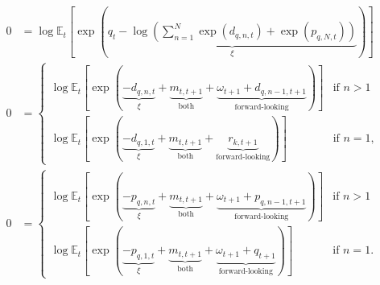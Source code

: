\documentclass[12 pt, oneside]{article}
\theoremstyle{definition}
\theoremstyle{definition}
\theoremstyle{definition}
\newcommand{\E}{\mathbb{E}}
\begin{document}
\begin{align}
  0 & = \log\E_t\left[\exp\left(\underbrace{q_t - \log\left(\sum_{n = 1}^{N}\exp(d_{q, n, t}) + \exp(p_{q, N, t})\right)}_{\xi}\right)\right]\\
  0 & =
      \begin{cases}
        \log\E_t\left[\exp\left(\underbrace{-d_{q, n, t}}_{\xi} + \underbrace{m_{t, t + 1}}_{\text{both}} + \underbrace{\omega_{t + 1} + d_{q, n - 1, t + 1}}_{\text{forward-looking}}\right)\right] & \text{if } n > 1\\
        \log\E_t\left[\exp\left(\underbrace{- d_{q, 1, t}}_{\xi} + \underbrace{m_{t, t + 1}}_{\text{both}} + \underbrace{r_{k, t + 1}}_{\text{forward-looking}} \right)\right] & \text{if } n = 1,
      \end{cases}\\
  0 & =
      \begin{cases}
        \log\E_t\left[\exp\left(\underbrace{-p_{q, n, t}}_{\xi} + \underbrace{m_{t, t + 1}}_{\text{both}} + \underbrace{\omega_{t + 1} + p_{q, n - 1, t + 1}}_{\text{forward-looking}} \right)\right] & \text{if } n > 1\\
        \log\E_t\left[\exp\left(\underbrace{-p_{q, 1, t}}_{\xi} + \underbrace{m_{t, t + 1}}_{\text{both}} + \underbrace{\omega_{t + 1} + q_{t + 1}}_{\text{forward-looking}}\right)\right] & \text{if }n = 1.
      \end{cases}
\end{align}
\end{document}
